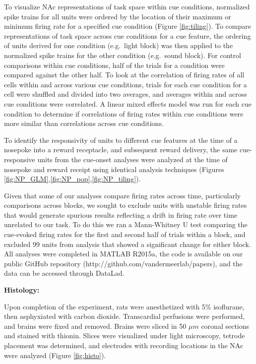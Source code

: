 \documentclass[11pt]{article}
\begin{document}
To visualize NAc representations of task space within cue conditions, normalized spike trains for all units were ordered by the location of their maximum or minimum firing rate for a specified cue condition (Figure \ref{fig:tiling}). To compare representations of task space across cue conditions for a cue feature, the ordering of units derived for one condition (e.g.\ light block) was then applied to the normalized spike trains for the other condition (e.g.\ sound block). For control comparisons within cue conditions, half of the trials for a condition were compared against the other half. To look at the correlation of firing rates of all cells within and across various cue conditions, trials for each cue condition for a cell were shuffled and divided into two averages, and averages within and across cue conditions were correlated. A linear mixed effects model was run for each cue condition to determine if correlations of firing rates within cue conditions were more similar than correlations across cue conditions.

To identify the responsivity of units to different cue features at the time of a nosepoke into a reward receptacle, and subsequent reward delivery, the same cue-responsive units from the cue-onset analyses were analyzed at the time of nosepoke and reward receipt using identical analysis techniques (Figures \ref{fig:NP_GLM},\ref{fig:NP_pop},\ref{fig:NP_tiling}).

Given that some of our analyses compare firing rates across time, particularly comparisons across blocks, we sought to exclude units with unstable firing rates that would generate spurious results reflecting a drift in firing rate over time unrelated to our task. To do this we ran a Mann-Whitney U test comparing the cue-evoked firing rates for the first and second half of trials within a block, and excluded 99 units from analysis that showed a significant change for either block. All analyses were completed in MATLAB R2015a, the code is available on our public GitHub repository (http://github.com/vandermeerlab/papers), and the data can be accessed through DataLad.

{\bf Histology:}

Upon completion of the experiment, rats were anesthetized with 5\% isoflurane, then asphyxiated with carbon dioxide. Transcardial perfusions were performed, and brains were fixed and removed. Brains were sliced in 50 $\mu m$ coronal sections and stained with thionin. Slices were visualized under light microscopy, tetrode placement was determined, and electrodes with recording locations in the NAc were analyzed (Figure \ref{fig:histo}).
\end{document}
